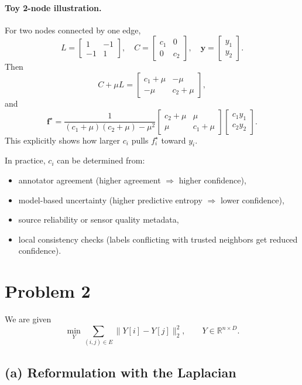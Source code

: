 \documentclass[11pt]{article}
\begin{document}
\paragraph{Toy 2-node illustration.}
For two nodes connected by one edge,
\[
L=\begin{bmatrix}1&-1\\-1&1\end{bmatrix},\quad
C=\begin{bmatrix}c_1&0\\0&c_2\end{bmatrix},\quad
\mathbf{y}=\begin{bmatrix}y_1\\y_2\end{bmatrix}.
\]
Then
\[
C+\mu L=
\begin{bmatrix}
c_1+\mu&-\mu\\
-\mu&c_2+\mu
\end{bmatrix},
\]
and
\[
\mathbf{f}^{\star}
=\frac{1}{(c_1+\mu)(c_2+\mu)-\mu^2}
\begin{bmatrix}
c_2+\mu&\mu\\
\mu&c_1+\mu
\end{bmatrix}
\begin{bmatrix}
c_1 y_1\\
c_2 y_2
\end{bmatrix}.
\]
This explicitly shows how larger \(c_i\) pulls \(f_i^\star\) toward \(y_i\).

In practice, $c_i$ can be determined from:
\begin{itemize}[leftmargin=1.2em]
\item annotator agreement (higher agreement $\Rightarrow$ higher confidence),
\item model-based uncertainty (higher predictive entropy $\Rightarrow$ lower confidence),
\item source reliability or sensor quality metadata,
\item local consistency checks (labels conflicting with trusted neighbors get reduced confidence).
\end{itemize}

\newpage
\section*{Problem 2}

We are given
\[
\min_Y \sum_{(i,j)\in E}\|Y[i]-Y[j]\|_2^2,\qquad Y\in\mathbb{R}^{n\times D}.
\]

\subsection*{(a) Reformulation with the Laplacian}
\end{document}
